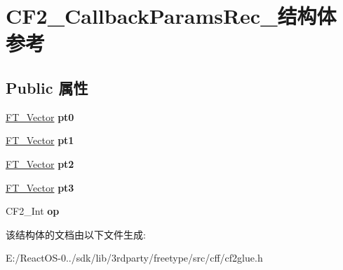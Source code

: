 \hypertarget{struct_c_f2___callback_params_rec__}{}\section{C\+F2\+\_\+\+Callback\+Params\+Rec\+\_\+结构体 参考}
\label{struct_c_f2___callback_params_rec__}
\subsection*{Public 属性}
\begin{DoxyCompactItemize}
\item 
\mbox{\label{struct_c_f2___callback_params_rec___a2837ac898e874600a12ad8a515675ac9}} 
\hyperlink{struct_f_t___vector__}{F\+T\+\_\+\+Vector} {\bfseries pt0}
\item 
\mbox{\label{struct_c_f2___callback_params_rec___a3174e665e945e6b738ef1f7be3be813a}} 
\hyperlink{struct_f_t___vector__}{F\+T\+\_\+\+Vector} {\bfseries pt1}
\item 
\mbox{\label{struct_c_f2___callback_params_rec___a3507cbcb8f68fa0f7c97151d2512732b}} 
\hyperlink{struct_f_t___vector__}{F\+T\+\_\+\+Vector} {\bfseries pt2}
\item 
\mbox{\label{struct_c_f2___callback_params_rec___a27b984ccac57a7d1611a4c40db8f043f}} 
\hyperlink{struct_f_t___vector__}{F\+T\+\_\+\+Vector} {\bfseries pt3}
\item 
\mbox{\label{struct_c_f2___callback_params_rec___aefcad63dd80e61f40f1089711362eed4}} 
C\+F2\+\_\+\+Int {\bfseries op}
\end{DoxyCompactItemize}


该结构体的文档由以下文件生成\+:\begin{DoxyCompactItemize}
\item 
E\+:/\+React\+O\+S-\/0../sdk/lib/3rdparty/freetype/src/cff/cf2glue.\+h\end{DoxyCompactItemize}
